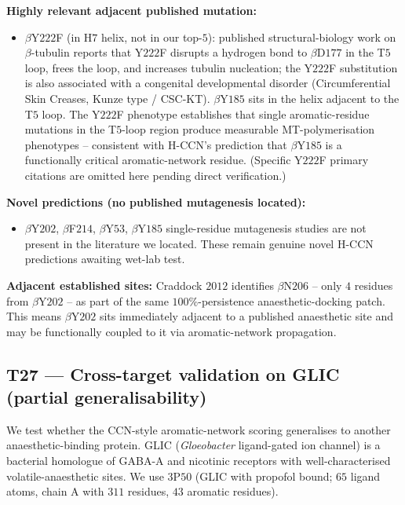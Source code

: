\documentclass[11pt,a4paper]{article}
\begin{document}
\textbf{Highly relevant adjacent published mutation:}

\begin{itemize}\itemsep0pt
  \item $\beta$Y$222$F (in H$7$ helix, not in our top-$5$): published
    structural-biology work on $\beta$-tubulin reports that Y$222$F
    disrupts a hydrogen bond to $\beta$D$177$ in the T$5$ loop, frees
    the loop, and increases tubulin nucleation; the Y$222$F substitution
    is also associated with a congenital developmental disorder
    (Circumferential Skin Creases, Kunze type / CSC-KT). $\beta$Y$185$
    sits in the helix adjacent to the T$5$ loop. The Y$222$F phenotype
    establishes that single aromatic-residue mutations in the T$5$-loop
    region produce measurable MT-polymerisation phenotypes -- consistent
    with H-CCN's prediction that $\beta$Y$185$ is a functionally critical
    aromatic-network residue. (Specific Y$222$F primary citations are
    omitted here pending direct verification.)
\end{itemize}

\textbf{Novel predictions (no published mutagenesis located):}

\begin{itemize}\itemsep0pt
  \item $\beta$Y$202$, $\beta$F$214$, $\beta$Y$53$, $\beta$Y$185$
    single-residue mutagenesis studies are not present in the literature
    we located. These remain genuine novel H-CCN predictions awaiting
    wet-lab test.
\end{itemize}

\textbf{Adjacent established sites:} Craddock $2012$ identifies
$\beta$N$206$ -- only $4$ residues from $\beta$Y$202$ -- as part of
the same $100\%$-persistence anaesthetic-docking patch. This means
$\beta$Y$202$ sits immediately adjacent to a published anaesthetic
site and may be functionally coupled to it via aromatic-network
propagation.

\subsection{\textsf{T27} --- Cross-target validation on GLIC (partial generalisability)}\label{ssec:t27}

We test whether the CCN-style aromatic-network scoring generalises
to another anaesthetic-binding protein. GLIC (\emph{Gloeobacter}
ligand-gated ion channel) is a bacterial homologue of GABA-A and
nicotinic receptors with well-characterised volatile-anaesthetic
sites. We use $3$P$50$ (GLIC with propofol bound; $65$ ligand atoms,
chain A with $311$ residues, $43$ aromatic residues).
\end{document}
